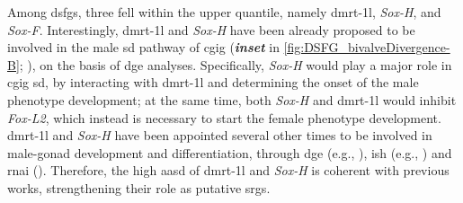 Among \glspl{dsfg}, three fell within the \fivepercent upper quantile, namely \gls{dmrt-1l}, \textit{Sox-H}, and \textit{Sox-F}. Interestingly, \gls{dmrt-1l} and \textit{Sox-H} have been already proposed to be involved in the male \gls{sd} pathway of \gls{cgig} (\textbf{\textit{inset}} in \cref{fig:DSFG_bivalveDivergence-B}; ), on the basis of \gls{dge} analyses. Specifically, \textit{Sox-H} would play a major role in \gls{cgig} \gls{sd}, by interacting with \gls{dmrt-1l} and determining the onset of the male phenotype development; at the same time, both \textit{Sox-H} and \gls{dmrt-1l} would inhibit \textit{Fox-L2}, which instead is necessary to start the female phenotype development. \gls{dmrt-1l} and \textit{Sox-H} have been appointed several other times to be involved in male-gonad development and differentiation, through \gls{dge} (e.g., ), \gls{ish} (e.g., ) and \gls{rnai} (). Therefore, the high \gls{aasd} of \gls{dmrt-1l} and \textit{Sox-H} is coherent with previous works, strengthening their role as putative \glspl{srg}.


